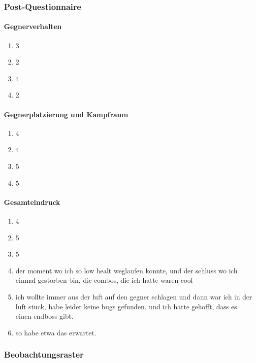 \documentclass[../Main.tex]{subfiles}
\begin{document}
\subsubsection{Post-Questionnaire}

\paragraph{Gegnerverhalten}
\begin{enumerate}[label=\textbf{Q\arabic*}, leftmargin=1.5cm, itemsep=0.5em]
    \item 3
    \item 2
    \item 4
    \item 2
\end{enumerate}

\paragraph{Gegnerplatzierung und Kampfraum}
\begin{enumerate}[label=\textbf{Q\arabic*}, leftmargin=1.5cm, itemsep=0.5em, resume]
    \item 4
    \item 4
    \item 5
    \item 5
\end{enumerate}

\paragraph{Gesamteindruck}
\begin{enumerate}[label=\textbf{Q\arabic*}, leftmargin=1.5cm, itemsep=0.5em, resume]
    \item 4
    \item 5
    \item 5
    \item der moment wo ich so low healt weglaufen konnte, und der schluss wo ich einmal gestorben bin, die combos, die ich hatte waren cool
    \item ich wollte immer aus der luft auf den gegner schlagen und dann war ich in der luft stuck, habe leider keine bugs gefunden. und ich hatte gehofft, dass es einen endboss gibt.
    \item so habe etwa das erwartet.
\end{enumerate}

\subsubsection{Beobachtungsraster}
\end{document}
